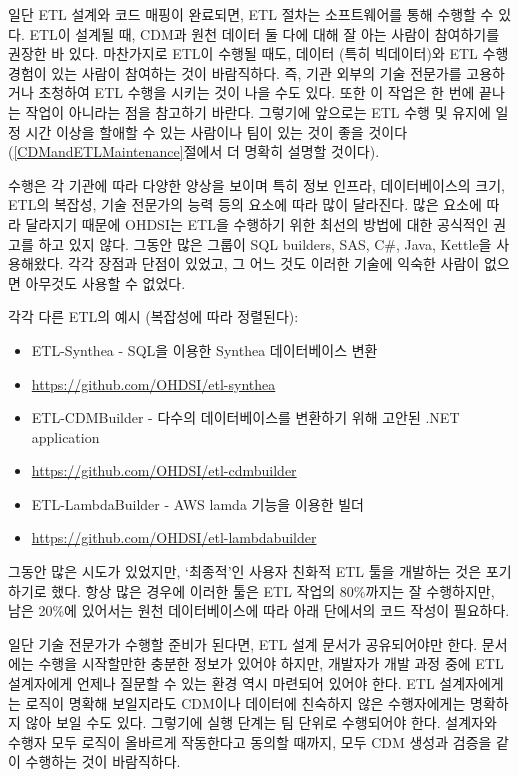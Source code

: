 \documentclass[10.5pt]{book}
\providecommand{\tightlist}{%
  \setlength{\itemsep}{0pt}\setlength{\parskip}{0pt}}
\theoremstyle{definition}
\theoremstyle{definition}
\theoremstyle{definition}
\theoremstyle{remark}
\begin{document}
일단 ETL 설계와 코드 매핑이 완료되면, ETL 절차는 소프트웨어를 통해
수행할 수 있다. ETL이 설계될 때, CDM과 원천 데이터 둘 다에 대해 잘 아는
사람이 참여하기를 권장한 바 있다. 마찬가지로 ETL이 수행될 때도, 데이터
(특히 빅데이터)와 ETL 수행 경험이 있는 사람이 참여하는 것이 바람직하다.
즉, 기관 외부의 기술 전문가를 고용하거나 초청하여 ETL 수행을 시키는 것이
나을 수도 있다. 또한 이 작업은 한 번에 끝나는 작업이 아니라는 점을
참고하기 바란다. 그렇기에 앞으로는 ETL 수행 및 유지에 일정 시간 이상을
할애할 수 있는 사람이나 팀이 있는 것이 좋을 것이다
(\ref{CDMandETLMaintenance}절에서 더 명확히 설명할 것이다).

수행은 각 기관에 따라 다양한 양상을 보이며 특히 정보 인프라,
데이터베이스의 크기, ETL의 복잡성, 기술 전문가의 능력 등의 요소에 따라
많이 달라진다. 많은 요소에 따라 달라지기 때문에 OHDSI는 ETL을 수행하기
위한 최선의 방법에 대한 공식적인 권고를 하고 있지 않다. 그동안 많은
그룹이 SQL builders, SAS, C\#, Java, Kettle을 사용해왔다. 각각 장점과
단점이 있었고, 그 어느 것도 이러한 기술에 익숙한 사람이 없으면 아무것도
사용할 수 없었다.

각각 다른 ETL의 예시 (복잡성에 따라 정렬된다):

\begin{itemize}
\tightlist
\item
  ETL-Synthea - SQL을 이용한 Synthea 데이터베이스 변환
\item
  \url{https://github.com/OHDSI/etl-synthea}
\item
  ETL-CDMBuilder - 다수의 데이터베이스를 변환하기 위해 고안된 .NET
  application
\item
  \url{https://github.com/OHDSI/etl-cdmbuilder}
\item
  ETL-LambdaBuilder - AWS lamda 기능을 이용한 빌더
\item
  \url{https://github.com/OHDSI/etl-lambdabuilder}
\end{itemize}

그동안 많은 시도가 있었지만, `최종적'인 사용자 친화적 ETL 툴을 개발하는
것은 포기하기로 했다. 항상 많은 경우에 이러한 툴은 ETL 작업의 80\%까지는
잘 수행하지만, 남은 20\%에 있어서는 원천 데이터베이스에 따라 아래
단에서의 코드 작성이 필요하다.

일단 기술 전문가가 수행할 준비가 된다면, ETL 설계 문서가 공유되어야만
한다. 문서에는 수행을 시작할만한 충분한 정보가 있어야 하지만, 개발자가
개발 과정 중에 ETL 설계자에게 언제나 질문할 수 있는 환경 역시 마련되어
있어야 한다. ETL 설계자에게는 로직이 명확해 보일지라도 CDM이나 데이터에
친숙하지 않은 수행자에게는 명확하지 않아 보일 수도 있다. 그렇기에 실행
단계는 팀 단위로 수행되어야 한다. 설계자와 수행자 모두 로직이 올바르게
작동한다고 동의할 때까지, 모두 CDM 생성과 검증을 같이 수행하는 것이
바람직하다.
\end{document}
